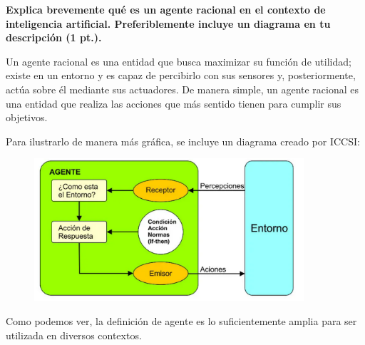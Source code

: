 \textbf{Explica brevemente qué es un agente racional en el contexto de inteligencia artificial. Preferiblemente incluye un diagrama en tu descripción (1 pt.).}\vspace{.3cm}

Un agente racional es una entidad que busca maximizar su función de utilidad; existe en un entorno y es capaz de percibirlo con sus sensores y, posteriormente, actúa sobre él mediante sus actuadores. De manera simple, un agente racional es una entidad que realiza las acciones que más sentido tienen para cumplir sus objetivos. \vspace{.3cm}

Para ilustrarlo de manera más gráfica, se incluye un diagrama creado por ICCSI: \vspace{.3cm}

\begin{figure}[H]
    \includegraphics[width=10cm]{src/Img/que-es-un-agente-software-racional-1.png}
    \centering
    \caption{\cite{iccsi_agente_racional_imagen}}
\end{figure}

Como podemos ver, la definición de agente es lo suficientemente amplia para ser utilizada en diversos contextos.

\cite{russell2020artificial}
